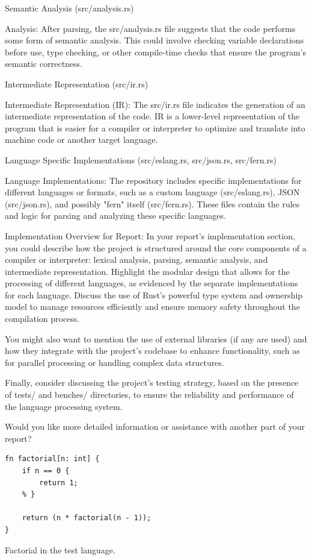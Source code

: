 Semantic Analysis (src/analysis.rs)

    Analysis: After parsing, the src/analysis.rs file suggests that the code
performs some form of semantic analysis. This could involve checking variable
declarations before use, type checking, or other compile-time checks that ensure
the program's semantic correctness.

Intermediate Representation (src/ir.rs)

    Intermediate Representation (IR): The src/ir.rs file indicates the
generation of an intermediate representation of the code. IR is a lower-level
representation of the program that is easier for a compiler or interpreter to
optimize and translate into machine code or another target language.

Language Specific Implementations (src/eslang.rs, src/json.rs, src/fern.rs)

    Language Implementations: The repository includes specific implementations
for different languages or formats, such as a custom language (src/eslang.rs),
JSON (src/json.rs), and possibly "fern" itself (src/fern.rs). These files
contain the rules and logic for parsing and analyzing these specific languages.

Implementation Overview for Report:
In your report's implementation section, you could describe how the project
is structured around the core components of a compiler or interpreter: lexical
analysis, parsing, semantic analysis, and intermediate representation. Highlight
the modular design that allows for the processing of different languages, as
evidenced by the separate implementations for each language. Discuss the use of
Rust's powerful type system and ownership model to manage resources efficiently
and ensure memory safety throughout the compilation process.

You might also want to mention the use of external libraries (if any are used)
and how they integrate with the project's codebase to enhance functionality,
such as for parallel processing or handling complex data structures.

Finally, consider discussing the project's testing strategy, based on the
presence of tests/ and benches/ directories, to ensure the reliability and
performance of the language processing system.

Would you like more detailed information or assistance with another part of
your report?



\begin{listing}[H]
\begin{verbatim}
fn factorial[n: int] {
    if n == 0 {
        return 1;
    % } 

    return (n * factorial(n - 1));
}
\end{verbatim}
\caption{Factorial in the test language.}
\label{lst:factorial_example}
\end{listing}

